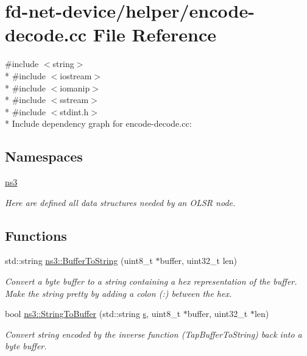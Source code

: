 \hypertarget{encode-decode_8cc}{}\section{fd-\/net-\/device/helper/encode-\/decode.cc File Reference}
\label{encode-decode_8cc}
{\ttfamily \#include $<$string$>$}\\*
{\ttfamily \#include $<$iostream$>$}\\*
{\ttfamily \#include $<$iomanip$>$}\\*
{\ttfamily \#include $<$sstream$>$}\\*
{\ttfamily \#include $<$stdint.\+h$>$}\\*
Include dependency graph for encode-\/decode.cc\+:
\subsection*{Namespaces}
\begin{DoxyCompactItemize}
\item 
 \hyperlink{namespacens3}{ns3}
\begin{DoxyCompactList}\small\item\em Here are defined all data structures needed by an O\+L\+SR node. \end{DoxyCompactList}\end{DoxyCompactItemize}
\subsection*{Functions}
\begin{DoxyCompactItemize}
\item 
std\+::string \hyperlink{namespacens3_a97907497171f00140c77ed054e3baad6}{ns3\+::\+Buffer\+To\+String} (uint8\+\_\+t $\ast$buffer, uint32\+\_\+t len)
\begin{DoxyCompactList}\small\item\em Convert a byte buffer to a string containing a hex representation of the buffer. Make the string pretty by adding a colon (\textquotesingle{}\+:\textquotesingle{}) between the hex. \end{DoxyCompactList}\item 
bool \hyperlink{namespacens3_a8582a97439c4fae64f9d073a91fc7699}{ns3\+::\+String\+To\+Buffer} (std\+::string \hyperlink{generate__test__data__lte__sinr_8m_ad83eeb3a142285d1243a08c6b7026df8}{s}, uint8\+\_\+t $\ast$buffer, uint32\+\_\+t $\ast$len)
\begin{DoxyCompactList}\small\item\em Convert string encoded by the inverse function (Tap\+Buffer\+To\+String) back into a byte buffer. \end{DoxyCompactList}\end{DoxyCompactItemize}
